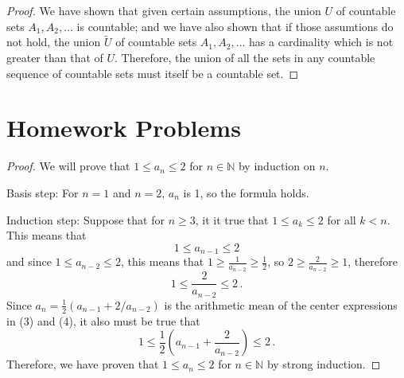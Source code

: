 \documentclass[10pt,letterpaper]{article}
\newcommand{\N}{\mathbb{N}}
\newenvironment{problem}[2][Problem]{\begin{trivlist}
\item[\hskip \labelsep {\bfseries #1}\hskip \labelsep {\bfseries #2.}]}{\end{trivlist}}
\begin{document}
\begin{proof}
 
 

 We have shown that given certain assumptions, the union $U$ of countable  sets $A_1, A_2, \ldots$ is countable; and we have also shown that if those assumtions do not hold, the union $\tilde{U}$ of countable sets $A_1, A_2, \ldots$ has a cardinality which is not greater than that of $U$. Therefore, the union of all the sets in any countable sequence of countable sets must itself be a countable set.




\end{proof}

\pagebreak

\section*{Homework Problems}

\begin{problem}{4.1}

\end{problem}

\begin{proof}
We will prove that $1 \leq a_n \leq 2$ for $n \in \N$ by induction on $n$. 

Basis step: For $n=1$ and $n=2$, $a_n$ is 1, so the formula holds. %

Induction step: Suppose that for $n \geq 3$, it it true that $1 \leq a_k \leq 2$ for all $k<n$. This means that 
\begin{equation}
1 \leq a_{n-1} \leq 2
\end{equation}
and since $1 \leq a_{n-2} \leq 2$, this means that $1 \geq \frac{1}{a_{n-2}} \geq \frac{1}{2}$, so $2 \geq \frac{2}{a_{n-2}} \geq 1$, therefore 
\begin{equation}
1 \leq \frac{2}{a_{n-2}} \leq 2 \, .
\end{equation}
Since $a_n=\frac{1}{2}(a_{n-1}+2/a_{n-2})$ is the arithmetic mean of the center expressions in (3) and (4), it also must be true that 
$$1 \leq \frac{1}{2} \left( a_{n-1}+ \frac{2}{a_{n-2}} \right) \leq 2\, .$$
Therefore, we have proven that $1 \leq a_n \leq 2$ for $n \in \N$ by strong induction.
\end{proof}
\end{document}
